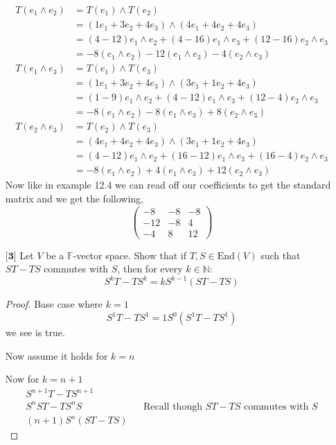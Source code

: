 \documentclass[12pt]{article}
\newcommand {\w} {{\wedge}}
\newcommand {\e}[3]{{#1e_1 + #2e_2 + #3e_3}}
\begin{document}
\begin{itemize}
\begin{align*}
        T(e_1 \wedge e_2) &= T(e_1) \wedge T(e_2) \\
        &=(\e{1}{3}{4}) \w (\e{4}{4}{4}) \\
        &= (4-12)e_1 \w e_2 + (4-16) e_1 \w e_3 + (12-16) e_2 \w e_3 \\ 
        &= -8(e_1 \w e_2) -12(e_1 \w e_3) -4(e_2\w e_3)\\
        T(e_1 \w e_3) &= T(e_1) \w T(e_3) \\ 
        &= (\e{1}{3}{4}) \w (\e{3}{1}{4}) \\
        &= (1-9)e_1 \w e_2 + (4-12)e_1 \w e_3 + (12 - 4)e_2 \w e_3 \\
        &= -8(e_1 \w e_2) -8(e_1 \w e_3) + 8 (e_2 \w e_3) \\
        T(e_2 \w e_3) &= T(e_2) \w T(e_3) \\
        &= (\e{4}{4}{4}) \w (\e{3}{1}{4}) \\
        &= (4 - 12)e_1 \w e_2 + (16-12)e_1\w e_3 + (16-4)e_2 \w e_3 \\
        &= -8(e_1 \w e_2) +4 (e_1 \w e_3) + 12(e_2 \w e_3)
    \end{align*}
    Now like in example 12.4 we can read off our coefficients to get the standard matrix and we get the following,
    \[\begin{pmatrix}
        -8 & -8 & -8 \\ -12 & -8 & 4 \\ -4 & 8 & 12
    \end{pmatrix}\]
    \vspace{.5cm}
    \item[$\textbf{[3]}$]
    Let $V$ be a $\mathbb{F}$-vector space. Show that if $T,S \in \text{End}(V)$ such that $ST - TS$ commutes with $S$, then for every $k \in \mathbb{N}$:
    \begin{equation*}
    S^kT - TS^k = kS^{k-1}(ST - TS)
    \end{equation*} 

    \begin{proof}
        Base case where $k = 1$
        \[S^1T - TS^1 = 1S^0(S^1T -TS^1)\]
        we see is true.

        Now assume it holds for $k = n$

        Now for $k = n +1$
        \begin{align*}
            S^{n+1}T - TS^{n+1} \\
            S^nST - TS^nS && \text{Recall though $ST-TS$ commutes with $S$} \\
            (n+1)S^n(ST-TS)
        \end{align*}


\end{proof}
\end{itemize}
\end{document}
